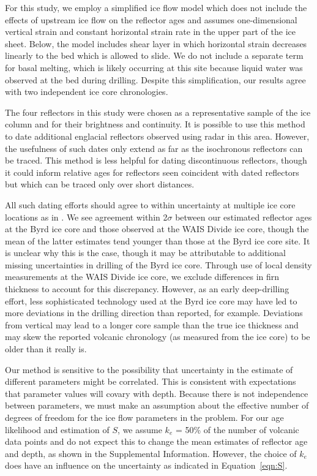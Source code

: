 For this study, we employ a simplified ice flow model which does not include the effects of upstream ice flow on the reflector ages and assumes one-dimensional vertical strain and constant horizontal strain rate in the upper part of the ice sheet. Below, the model includes shear layer in which horizontal strain decreases linearly to the bed which is allowed to slide. We do not include a separate term for basal melting, which is likely occurring at this site because liquid water was observed at the bed during drilling. Despite this simplification, our results agree with two independent ice core chronologies.

The four reflectors in this study were chosen as a representative sample of the ice column and for their brightness and continuity. It is possible to use this method to date additional englacial reflectors observed using radar in this area. However, the usefulness of such dates only extend as far as the isochronous reflectors can be traced. This method is less helpful for dating discontinuous reflectors, though it could inform relative ages for reflectors seen coincident with dated reflectors but which can be traced only over short distances. 

All such dating efforts should agree to within uncertainty at multiple ice core locations as in \citet{cavitte2016}. We see agreement within 2$\sigma$ between our estimated reflector ages at the Byrd ice core and those observed at the WAIS Divide ice core, though the mean of the latter estimates tend younger than those at the Byrd ice core site. It is unclear why this is the case, though it may be attributable to additional missing uncertainties in drilling of the Byrd ice core. Through use of local density measurements at the WAIS Divide ice core, we exclude differences in firn thickness to account for this discrepancy. However, as an early deep-drilling effort, less sophisticated technology used at the Byrd ice core may have led to more deviations in the drilling direction than reported, for example. Deviations from vertical may lead to a longer core sample than the true ice thickness and may skew the reported volcanic chronology (as measured from the ice core) to be older than it really is. 

Our method is sensitive to the possibility that uncertainty in the estimate of different parameters might be correlated. This is consistent with expectations that parameter values will covary with depth. Because there is not independence between parameters, we must make an assumption about the effective number of degrees of freedom for the ice flow parameters in the problem.  For our age likelihood and estimation of $S$, we assume $k_e$ = 50\% of the number of volcanic data points and do not expect this to change the mean estimates of reflector age and depth, as shown in the Supplemental Information. However, the choice of $k_e$ does have an influence on the uncertainty as indicated in Equation~\ref{eqn:S}.\\




